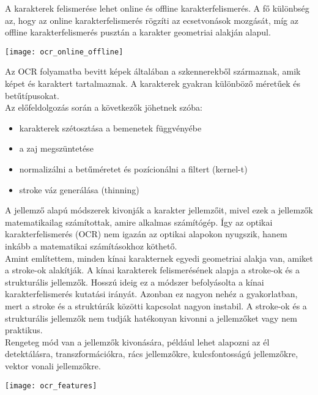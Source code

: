 A karakterek felismerése lehet online és offline karakterfelismerés. A fő különbség az, hogy az online karakterfelismerés rögzíti az ecsetvonások mozgását, míg az offline karakterfelismerés pusztán a karakter geometriai alakján alapul.\\

\begin{center}
\texttt{[image: ocr\_online\_offline]}
\end{center}

Az OCR folyamatba bevitt képek általában a szkennerekből származnak, amik képet és karaktert tartalmaznak. A karakterek gyakran különböző méretűek és betűtípusokat.\\

Az előfeldolgozás során a következők jöhetnek szóba: 
\begin{itemize}
\item karakterek szétosztása a bemenetek függvényébe
\item a zaj megszüntetése
\item normalizálni a betűméretet és pozícionálni a filtert (kernel-t)
\item stroke váz generálása (thinning)
\end{itemize}

A jellemző alapú módszerek kivonják a karakter jellemzőit, mivel ezek a jellemzők matematikailag számítottak, amire alkalmas számítógép. Így az optikai karakterfelismerés (OCR) nem igazán az optikai alapokon nyugszik, hanem inkább a matematikai számításokhoz köthető.\\

Amint említettem, minden kínai karakternek egyedi geometriai alakja van, amiket a stroke-ok alakítják. A kínai karakterek felismerésének alapja a stroke-ok és a strukturális jellemzők. Hosszú ideig ez a módszer befolyásolta a kínai karakterfelismerés kutatási irányát. Azonban ez nagyon nehéz a gyakorlatban, mert a stroke és a struktúrák közötti kapcsolat nagyon instabil. A stroke-ok és a strukturális jellemzők nem tudják hatékonyan kivonni a jellemzőket vagy nem praktikus.\\

Rengeteg mód van a jellemzők kivonására, például lehet alapozni az él detektálásra, transzformációkra, rács jellemzőkre, kulcsfontosságú jellemzőkre, vektor vonali jellemzőkre.\\

\begin{center}
\texttt{[image: ocr\_features]}
\end{center}


